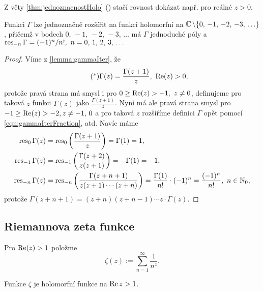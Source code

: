 \begin{note*}
Z věty \cref{thm:jednoznacnostHolo} () stačí rovnost dokázat např. pro reálné $z>0$.
\end{note*}

\begin{lemma}
Funkci $\Gamma$ lze jednoznačně rozšířit na funkci holomorfní na $\operatorname{\mathbb{C}}\setminus\{0,\,-1,\,-2,\,-3,\,\ldots\}$, přičemž v bodech $0,\,-1,\,-2,\,-3,\,\ldots$ 
má $\Gamma$ jednoduché póly a $\operatorname{res}_{-n}\Gamma=(-1)^n/n!,\  n=0,\,1,\,2,\,3,\,\ldots$ 
\end{lemma}

\begin{proof}
Víme z \cref{lemma:gammaIter}, že
\begin{equation}\tag{*}\label{eqn:gammaIterFraction}
    \Gamma(z)=\frac{\Gamma(z+1)}{z},\ \operatorname{Re}(z)>0,
\end{equation}
protože pravá strana má smysl i pro $0\geq\operatorname{Re}(z)>-1,\ z\neq 0$, definujeme pro taková $z$ funkci $\Gamma(z)$ jako $\frac{\Gamma(z+1)}{z}$. Nyní má ale pravá strana smysl pro $-1\geq\operatorname{Re}(z)>-2, z\neq-1,\,0$ a pro taková $z$ rozšíříme definici $\Gamma$ opět pomocí \cref{eqn:gammaIterFraction}, atd. Navíc máme 
\begin{align*}
    \res_0\Gamma(z)&=\res_0\left(\frac{\Gamma(z+1)}{z}\right)=\Gamma(1)=1, \\
    \res_{-1}\Gamma(z)&=\res_{-1}\left(\frac{\Gamma(z+2)}{z(z+1)}\right)=-\Gamma(1)=-1, \\
    \res_{-n}\Gamma(z)&=\res_{-n}\left(\frac{\Gamma(z+n+1)}{z(z+1)\cdots(z+n)}\right)=\frac{\Gamma(1)}{n!}\cdot(-1)^n=\frac{(-1)^n}{n!},\ n \in \N_0,
\end{align*}
protože $\Gamma(z+n+1)=(z+n)(z+n-1) \cdots z \cdot \Gamma(z)$.
\end{proof}

\subsection{Riemannova zeta funkce}

\begin{definition}
Pro $\operatorname{Re}(z)>1$ položme
\begin{equation}\label{eqn:zeta}
    \zeta(z):=\sum_{n=1}^\infty \frac{1}{n^z}.
\end{equation}
\end{definition}

\begin{lemma}
Funkce $\zeta$ je holomorfní funkce na $\operatorname{Re} z>1$.
\end{lemma}

